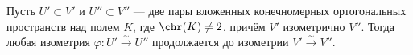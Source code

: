 \documentclass[
	extrafontsizes,
	11pt,
	hyphens,
]{memoir}
\begin{document}

\begin{theorem}
\label{thm:witt_theorem}
Пусть \(U' \subset V'\) и \(U'' \subset V''\) --- две пары вложенных конечномерных ортогональных пространств над полем \(K\), где \(\chr(K) \neq 2\), причём \(V'\) изометрично \(V''\).
Тогда любая изометрия  \(\varphi : U' \xrightarrow{\sim} U''\) продолжается до изометрии \(V' \xrightarrow{\sim} V''\).
\end{theorem}
\end{document}
